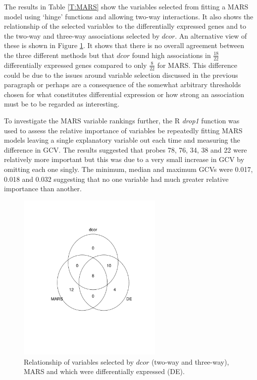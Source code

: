 \documentclass[a4paper, 12pt]{report}
\begin{document}
The results in Table \ref{T:MARS} show the variables selected from fitting a MARS model using `hinge' functions and allowing two-way interactions. It also shows the relationship of the selected variables to the differentially expressed genes and to the two-way and three-way associations selected by $dcor$. An alternative view of these is shown in Figure \ref{F:vennMARS}. It shows that there is no overall agreement between the three different methods but that $dcor$ found high associations in $\frac{18}{22}$ differentially expressed genes compared to only $\frac{8}{22}$ for MARS. This difference could be due to the issues around variable selection discussed in the previous paragraph or perhaps are a consequence of the somewhat arbitrary thresholds chosen for what constitutes differential expression or how strong an association must be to be regarded as interesting. 

To investigate the MARS variable rankings further, the R \textit{drop1} function was used to assess the relative importance of variables be repeatedly fitting MARS models leaving a single explanatory variable out each time and measuring the difference in GCV. The results suggested that probes 78, 76, 34, 38 and 22 were relatively more important but this was due to a very small increase in GCV  by omitting each one singly. The minimum, median and maximum GCVs were 0.017, 0.018 and 0.032 suggesting that no one variable had much greater relative importance than another. 

\begin{figure}[H]
\begin{centering}
\includegraphics[width=7cm]{vennMARS.pdf}
\caption{Relationship of variables selected by $dcor$ (two-way and three-way), MARS and which were differentially expressed (\gls{DE}).} 
\label{F:vennMARS}
\end{centering}
\end{figure}
\end{document}
